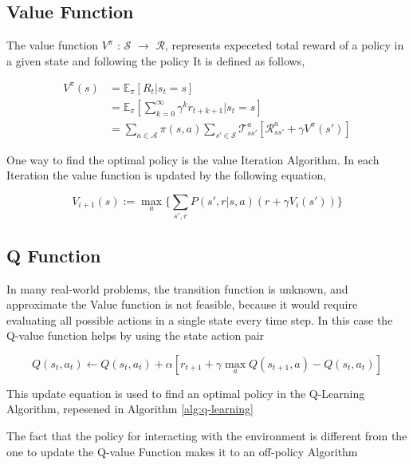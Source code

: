 \subsection{Value Function}
The value function $V^{\pi}$ : $\mathcal{S}$ $\rightarrow$ $\mathcal{R}$, represents expeceted total reward of a policy in a given state and following the policy
It is defined as follows,
 
\begin{equation}
  \begin{aligned}
    V^{\pi}(s) &= \mathbb{E}_{\pi} [R_t | s_t = s] \\
    &= \mathbb{E}_{\pi} [\sum^{\infty}_{k=0} \gamma^{k} r_{t+k+1} | s_t = s] \label{MDP:eq1} \\
    &= \sum_{a \in \mathcal{A}} \pi(s, a) \sum_{s' \in \mathcal{S}} \mathcal{T}^{a}_{ss'}[\mathcal{R}^{a}_{ss'} + \gamma V^\pi(s')]
  \end{aligned}
\end{equation}


One way to find the optimal policy is the value Iteration Algorithm.
In each Iteration the value function is updated by the following equation,

\begin{equation}
  V_{i+1}(s) := \max_a \Big\{ \sum_{s', r} P(s',r| s,a) (r + \gamma V_i(s')) \Big\}
\end{equation}


\subsection{Q Function}

In many real-world problems, the transition function is unknown, and approximate the Value function is not feasible, because
it would require evaluating all possible actions in a single state every time step.
In this case the Q-value function helps by using the state action pair


\begin{equation}
  Q(s_t, a_t) \leftarrow Q(s_t, a_t) + \alpha[r_{t+1} + \gamma \max_a Q(s_{t+1}, a) - Q(s_t, a_t)]
\end{equation}


This update equation is used to find an optimal policy in the Q-Learning Algorithm, repesened in Algorithm \ref{alg:q-learning}




The fact that the policy for interacting with the environment is different from the one to update the Q-value Function makes it to an off-policy Algorithm


